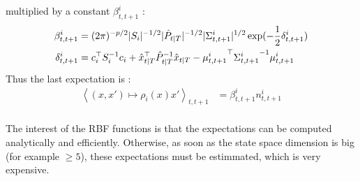 multiplied by a constant $\beta^{i}_{t,t+1}$ :
\begin{align*}
  \beta^i_{t,t+1} &= (2\pi)^{-p/2} |S_i|^{-1/2} |\hat{P}_{t|T}|^{-1/2} |\Sigma^i_{t,t+1}|^{1/2} \exp(-\frac{1}{2} \delta^i_{t,t+1})\\
  \delta^i_{t,t+1} &= c_i^{\top} S_i^{-1} c_i + \hat{x}_{t \mathbin{\vert} T}^{\top} \hat{P}_{t \mathbin{\vert} T}^{-1} \hat{x}_{t \mathbin{\vert} T} - {\mu^i_{t,t+1}}^{\top} {\Sigma^i_{t,t+1}}^{-1} \mu^i_{t,t+1}\\
\end{align*}
Thus the last expectation is :
\begin{align*}
  \left< (x,x') \mapsto \rho_i(x) x' \right>_{t,t+1} &= \beta^i_{t,t+1}n^i_{t,t+1}\\
\end{align*}

The interest of the RBF functions is that the expectations can be computed analytically and efficiently.
Otherwise, as soon as the state space dimension is big (for example $\geq 5$), these expectations must be estimmated, which is very expensive.
